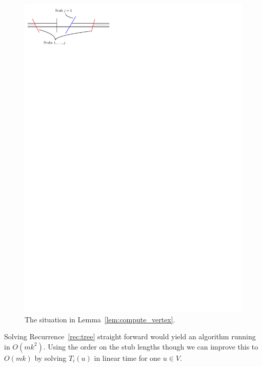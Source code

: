 \documentclass[a4paper,english,numberwithinsect]{eurocg18}
\begin{document}
\begin{figure}
	\centering
	\includegraphics{speedup}
	\caption{The situation in Lemma~\ref{lem:compute_vertex}.}
	\label{fig:speedup}
\end{figure}
Solving Recurrence~\ref{rec:tree} straight forward would yield an algorithm running in $ O(mk^2) $. Using the order on the stub lengths though we can improve this to $ O(mk) $ by solving $ T_i(u) $ in linear time for one $ u \in V $.
\end{document}
